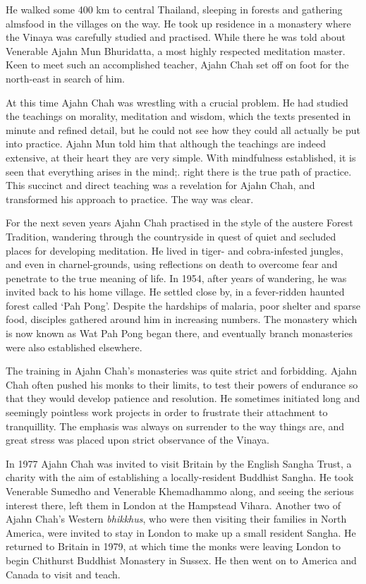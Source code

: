 He walked some 400 km to central Thailand, sleeping in forests and
gathering almsfood in the villages on the way. He took up residence in a
monastery where the Vinaya was carefully studied and practised. While
there he was told about Venerable Ajahn Mun Bhuridatta, a most highly
respected meditation master. Keen to meet such an accomplished teacher,
Ajahn Chah set off on foot for the north-east in search of him.

At this time Ajahn Chah was wrestling with a crucial problem. He had
studied the teachings on morality, meditation and wisdom, which the
texts presented in minute and refined detail, but he could not see how
they could all actually be put into practice. Ajahn Mun told him that
although the teachings are indeed extensive, at their heart they are
very simple. With mindfulness established, it is seen that everything
arises in the mind;. right there is the true path of practice. This
succinct and direct teaching was a revelation for Ajahn Chah, and
transformed his approach to practice. The way was clear.

For the next seven years Ajahn Chah practised in the style of the
austere Forest Tradition, wandering through the countryside in quest of
quiet and secluded places for developing meditation. He lived in tiger-
and cobra-infested jungles, and even in charnel-grounds, using
reflections on death to overcome fear and penetrate to the true meaning
of life. In 1954, after years of wandering, he was invited back to his
home village. He settled close by, in a fever-ridden haunted forest
called `Pah Pong'. Despite the hardships of malaria, poor shelter and
sparse food, disciples gathered around him in increasing numbers. The
monastery which is now known as Wat Pah Pong began there, and eventually
branch monasteries were also established elsewhere.

The training in Ajahn Chah's monasteries was quite strict and
forbidding. Ajahn Chah often pushed his monks to their limits, to test
their powers of endurance so that they would develop patience and
resolution. He sometimes initiated long and seemingly pointless work
projects in order to frustrate their attachment to tranquillity. The
emphasis was always on surrender to the way things are, and great stress
was placed upon strict observance of the Vinaya.

In 1977 Ajahn Chah was invited to visit Britain by the English Sangha
Trust, a charity with the aim of establishing a locally-resident
Buddhist Sangha. He took Venerable Sumedho and Venerable Khemadhammo
along, and seeing the serious interest there, left them in London at the
Hampstead Vihara. Another two of Ajahn Chah's Western \emph{bhikkhus},
who were then visiting their families in North America, were invited to
stay in London to make up a small resident Sangha. He returned to
Britain in 1979, at which time the monks were leaving London to begin
Chithurst Buddhist Monastery in Sussex. He then went on to America and
Canada to visit and teach.


